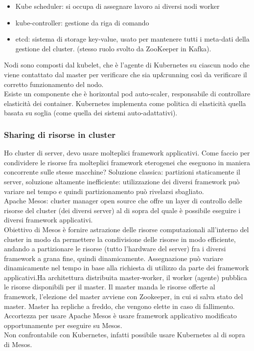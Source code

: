 \documentclass{article}
\begin{document}
\begin{itemize}
\item Kube scheduler: si occupa di assegnare lavoro ai diversi nodi worker
\item kube-controller: gestione da riga di comando
\item etcd: sistema di storage key-value, usato per mantenere tutti i meta-dati della gestione del cluster. (stesso ruolo svolto da ZooKeeper in Kafka).
\end{itemize}
Nodi sono composti dal kubelet, che è l'agente di Kubernetes su ciascun nodo che viene contattato dal master per verificare che sia up\&running così da verificare il corretto funzionamento del nodo.\\ Esiste un componente che è horizontal pod auto-scaler, responsabile di controllare elasticità dei container. Kubernetes implementa come politica di elasticità quella basata su soglia (come quella dei sistemi auto-adattativi).
\subsubsection{Sharing di risorse in cluster}
Ho cluster di server, devo usare molteplici framework applicativi. Come faccio per condividere le risorse fra molteplici framework eterogenei che eseguono in maniera concorrente sulle stesse macchine? Soluzione classica: partizioni staticamente il server, soluzione altamente inefficiente: utilizzazione dei diversi framework può variare nel tempo e quindi partizionamento può rivelarsi sbagliato.\\ Apache Mesos: cluster manager open source che offre un layer di controllo delle risorse del cluster (dei diversi server) al di sopra del quale è possibile eseguire i diversi framework applicativi.\\ Obiettivo di Mesos è fornire astrazione delle risorse computazionali all'interno del cluster in modo da permettere la condivisione delle risorse in modo efficiente, andando a partizionare le risorse (tutto l'hardware del server) fra i diversi framework a grana fine, quindi dinamicamente. Assegnazione può variare dinamicamente nel tempo in base alla richiesta di utilizzo da parte dei framework applicativi.Ha architettura distribuita master-worker, il worker (agente) pubblica le risorse disponibili per il master. Il master manda le risorse offerte al framework, l'elezione del master avviene con Zookeeper, in cui si salva stato del master. Master ha repliche a freddo, che vengono elette in caso di fallimento.\\ Accortezza per usare Apache Mesos è usare framework applicativo modificato opportunamente per eseguire su Mesos.\\ Non confrontabile con Kubernetes, infatti  possibile usare Kubernetes al di sopra di Mesos.
\end{document}
